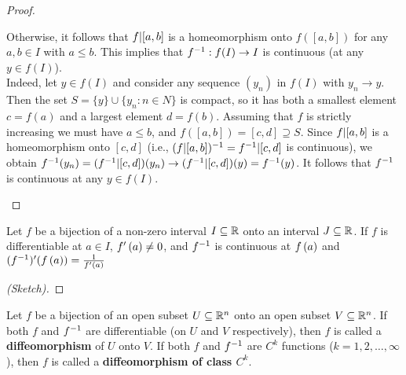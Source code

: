 \begin{proof}
\begin{enumerate}
        Otherwise, it follows that $f \vert [a,b]$ is a homeomorphism onto $f([a,b])$ for any $a,b \in I$ with $a \leq b$. This implies that $f ^{-1}: f(I) \to I$ is continuous (at any $y \in f(I)$). \\
        Indeed, let $y \in f(I)$ and consider any sequence $(y_n)$ in $f(I)$ with $y_n \to y$. Then the set $S = \{y\} \cup \{y_n: n \in N\}$ is compact, so it has both a smallest element $c = f(a)$ and a largest element $d = f(b)$. Assuming that $f$ is strictly increasing we must have $a \leq b$, and $f([a,b]) = [c,d] \supseteq S$. Since $f \vert [a,b]$ is a homeomorphism onto $[c,d]$ (i.e., $(f \vert [a,b])^{-1} = f^{-1} \vert [c,d]$ is continuous), we obtain $f ^{-1} (y_n) = (f ^{-1} \vert [c,d])(y_n) \to (f ^{-1} \vert [c,d])(y) = f ^{-1} (y)$. It follows that $f ^{-1}$ is continuous at any $y \in f(I)$.
    \end{enumerate}
\end{proof}

\begin{theorem}
    Let $f$ be a bijection of a non-zero interval $I \subseteq \mathbb{R}$ onto an interval $J \subseteq \mathbb{R}$. If $f$ is differentiable at $a \in I$, $f'\left(a\right) \neq 0$, and $f^{-1}$ is continuous at $f\left(a\right)$ and $(f^{-1})'(f\left(a\right)) = \frac{1}{f'\left(a\right)}$
\end{theorem}
\begin{proof}[(Sketch)]
    
\end{proof}

\begin{definition}[a diffeomorphism]
    Let $f$ be a bijection of an open subset $U \subseteq \mathbb{R}^n$ onto an open subset $V \subseteq \mathbb{R}^n$. If both $f$ and $f^{-1}$ are differentiable (on $U$ and $V$ respectively), then $f$ is called a \textbf{diffeomorphism} of $U$ onto $V$. If both $f$ and $f^{-1}$ are $C^k$ functions ($k=1, 2, \dots, \infty$), then $f$ is called a \textbf{diffeomorphism of class $C^k$}.
\end{definition}

